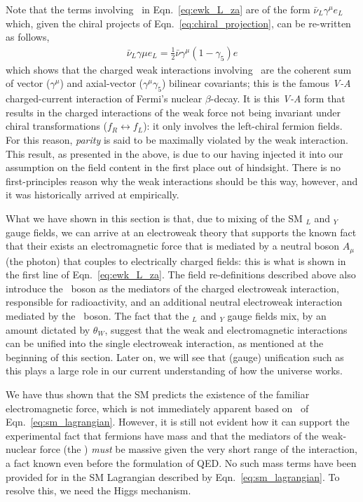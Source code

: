 Note that the terms involving \fieldWpm~in Eqn.~\ref{eq:ewk_L_za} are of the form $\bar{\nu}_L \gamma^{\mu} e_L$
which, given the chiral projects of Eqn.~\ref{eq:chiral_projection}, can be
re-written as follows,
\begin{align}
	\bar{\nu}_L \gamma{\mu} e_L = \frac{1}{2} \bar{\nu} \gamma^{\mu}(1-\gamma_5) e
	\label{eq:v_minus_a}
\end{align}
which shows that the charged weak interactions involving \fieldWpm~are the coherent
sum of vector ($\gamma^{\mu}$) and axial-vector ($\gamma^{\mu}\gamma_5$) bilinear covariants; this is the famous
\textit{V-A} charged-current interaction of Fermi's nuclear $\beta$-decay.
It is this \textit{V-A} form that results in the charged interactions of the weak force
not being invariant under chiral transformations ($f_R \leftrightarrow f_L$): it only involves
the left-chiral fermion fields. For this reason, \textit{parity}
is said to be maximally violated by the weak interaction.
This result, as presented in the above, is due to our having injected
it into our assumption on the field content in the first place out of hindsight. There
is no first-principles reason why the weak interactions should be this way, however,
and it was historically arrived at empirically.

What we have shown in this section is that, due to mixing of the SM \SUtwo$_L$
and \Uone$_Y$ gauge fields, we can arrive at an electroweak theory that supports
the known fact that their exists an electromagnetic force that is mediated
by a neutral boson $A_{\mu}$ (the photon) that couples to electrically charged fields: this is what
is shown in the first line of Eqn.~\ref{eq:ewk_L_za}. The field re-definitions described above
also introduce the \fieldWpm~boson as the mediators of the charged electroweak interaction,
responsible for radioactivity, and an additional neutral electroweak interaction mediated
by the \fieldZ~boson.
The fact that the \SUtwo$_L$ and \Uone$_Y$ gauge fields mix, by an amount dictated by $\theta_W$,
suggest that the weak and electromagnetic interactions can be unified into the single
electroweak interaction, as mentioned at the beginning of this section. Later on, we will see
that (gauge) unification such as this plays a large role in our current understanding
of how the universe works.

We have thus shown that the SM predicts the existence of the familiar electromagnetic force,
which is not immediately apparent based on \SML~of Eqn.~\ref{eq:sm_lagrangian}. 
However, it is still not evident how it can
support the experimental fact that fermions have mass and that the mediators of the
weak-nuclear force (the \fieldWpm) \textit{must} be massive given the very short
range of the interaction, a fact known
even before the formulation of QED. No such mass terms
have been provided for in the SM Lagrangian described by Eqn.~\ref{eq:sm_lagrangian}. To resolve this, we need the Higgs mechanism.
